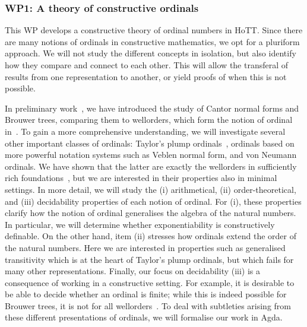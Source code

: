 \documentclass[a4paper,11pt]{article}
\let\oldcite\cite
\renewcommand*\cite[1]{{\protect\NoHyper\oldcite{#1}\protect\endNoHyper}}
\begin{document}
\subsubsection*{WP1: A theory of constructive ordinals}
\vspace*{-0.25em}
This WP develops a constructive theory of ordinal numbers in HoTT. Since there are many notions of ordinals in constructive mathematics, we opt for a %
pluriform approach. %
%
We will not study the different concepts in isolation, but also identify how they compare and connect to each other.
%
This will allow the transferal of results from one representation to another, or yield proofs of when this is not possible.

In preliminary work~\cite{ordTCS}, we have introduced the study of Cantor normal forms and Brouwer trees, comparing them to wellorders, which form the notion of ordinal in~\cite{hott-book}. To gain a more comprehensive understanding, we will investigate several other important classes of ordinals: Taylor's plump ordinals~\cite{Taylor1996}, ordinals based on more powerful notation systems such as Veblen normal form, and von Neumann ordinals. We have shown that the latter are exactly the wellorders in sufficiently rich foundations~\cite{dejong-kra-nf-xu:set-type-ordinals}, but we are interested in their properties also in minimal settings.
In more detail, we will study the
(i) arithmetical,
(ii) order-theoretical, and
(iii) decidability
properties of each notion of ordinal.
%
For (i), these properties clarify how the notion of ordinal generalises the algebra of the natural numbers. In particular, we will determine whether exponentiability is constructively definable.
%
On the other hand, item (ii) stresses how ordinals extend the order of the natural numbers. Here we are interested in properties such as generalised transitivity which is at the heart of Taylor's plump ordinals, but which fails for many other representations.
%
Finally, our focus on decidability (iii) is a consequence of working in a constructive setting. For example, it is desirable to be able to decide whether an ordinal is finite; while this is indeed possible for Brouwer trees, it is not for all wellorders~\cite{ordTCS}.
To deal with subtleties arising from these different presentations of ordinals, we will formalise our work in Agda.

\end{document}
